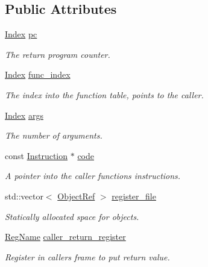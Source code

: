 \subsection*{Public Attributes}
\begin{DoxyCompactItemize}
\item 
\hyperlink{namespacetvm_1_1runtime_1_1vm_a3597867d2db714bf760876a23d6b7d3d}{Index} \hyperlink{structtvm_1_1runtime_1_1vm_1_1VMFrame_af798dec5a7e9049d6673093d2f3e7dea}{pc}
\begin{DoxyCompactList}\small\item\em The return program counter. \end{DoxyCompactList}\item 
\hyperlink{namespacetvm_1_1runtime_1_1vm_a3597867d2db714bf760876a23d6b7d3d}{Index} \hyperlink{structtvm_1_1runtime_1_1vm_1_1VMFrame_a96a641c01ca63e6b146ef321319ec1f4}{func\+\_\+index}
\begin{DoxyCompactList}\small\item\em The index into the function table, points to the caller. \end{DoxyCompactList}\item 
\hyperlink{namespacetvm_1_1runtime_1_1vm_a3597867d2db714bf760876a23d6b7d3d}{Index} \hyperlink{structtvm_1_1runtime_1_1vm_1_1VMFrame_a189d59efcb86fa14dc486c2852a5f01b}{args}
\begin{DoxyCompactList}\small\item\em The number of arguments. \end{DoxyCompactList}\item 
const \hyperlink{structtvm_1_1runtime_1_1vm_1_1Instruction}{Instruction} $\ast$ \hyperlink{structtvm_1_1runtime_1_1vm_1_1VMFrame_a6b1467a43cd8cb5123b08bbb4b39f428}{code}
\begin{DoxyCompactList}\small\item\em A pointer into the caller function\textquotesingle{}s instructions. \end{DoxyCompactList}\item 
std\+::vector$<$ \hyperlink{classtvm_1_1runtime_1_1ObjectRef}{Object\+Ref} $>$ \hyperlink{structtvm_1_1runtime_1_1vm_1_1VMFrame_a583dcf6c0ed3f3d2916679382c7a0775}{register\+\_\+file}
\begin{DoxyCompactList}\small\item\em Statically allocated space for objects. \end{DoxyCompactList}\item 
\hyperlink{namespacetvm_1_1runtime_1_1vm_a3bbbf700719e9dc3dda2bc25210c18ae}{Reg\+Name} \hyperlink{structtvm_1_1runtime_1_1vm_1_1VMFrame_a2f6c425a89ee6872ead9bc71ab87fdd1}{caller\+\_\+return\+\_\+register}
\begin{DoxyCompactList}\small\item\em Register in caller\textquotesingle{}s frame to put return value. \end{DoxyCompactList}\end{DoxyCompactItemize}


